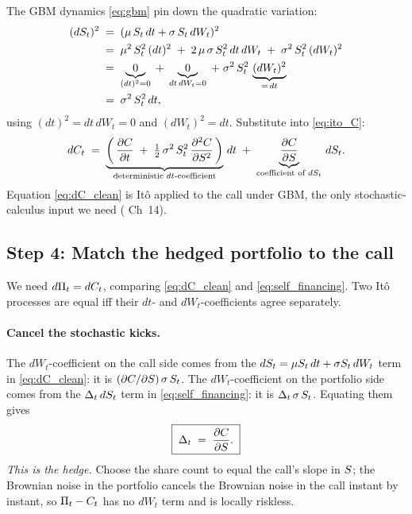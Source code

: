 The GBM dynamics \eqref{eq:gbm} pin down the quadratic variation:
\begin{align}
  (dS_t)^2
  \;&=\; (\mu\,S_t\,dt + \sigma\,S_t\,dW_t)^2
  \nonumber \\
  \;&=\; \mu^2\,S_t^2\,(dt)^2
       \;+\; 2\,\mu\,\sigma\,S_t^2\,dt\,dW_t
       \;+\; \sigma^2\,S_t^2\,(dW_t)^2
  \nonumber \\
  \;&=\; \underbrace{0}_{(dt)^2 = 0}
       \;+\; \underbrace{0}_{dt\,dW_t = 0}
       \;+\; \sigma^2\,S_t^2\,
             \underbrace{(dW_t)^2}_{=\,dt}
  \nonumber \\
  \;&=\; \sigma^2\,S_t^2\,dt,
  \label{eq:dS_squared}
\end{align}
using $(dt)^2 = dt\,dW_t = 0$ and $(dW_t)^2 = dt$. Substitute
into \eqref{eq:ito_C}:
\begin{equation}
  dC_t
  \;=\;
  \underbrace{\left(\,\frac{\partial C}{\partial t}
              \;+\; \tfrac{1}{2}\,\sigma^2\,S_t^2\,
                    \frac{\partial^2 C}{\partial S^2}\,\right)}_{
              \text{deterministic } dt\text{-coefficient}}
  \,dt
  \;+\;
  \underbrace{\frac{\partial C}{\partial S}}_{
              \text{coefficient of }dS_t}
  \,dS_t.
  \label{eq:dC_clean}
\end{equation}
Equation \eqref{eq:dC_clean} is It\^o applied to the call under
GBM, the only stochastic-calculus input we need
(\citeHull{} Ch~14).

\subsection{Step 4: Match the hedged portfolio to the call}
\label{subsec:ch15_pde_step4}

We need $d\Pi_t = dC_t$, comparing \eqref{eq:dC_clean} and
\eqref{eq:self_financing}. Two It\^o processes are equal iff
their $dt$- and $dW_t$-coefficients agree separately.

\paragraph{Cancel the stochastic kicks.}
The $dW_t$-coefficient on the call side comes from the
$dS_t = \mu S_t\, dt + \sigma S_t\, dW_t$ term in
\eqref{eq:dC_clean}: it is $(\partial C/\partial S)\,
\sigma\,S_t$. The $dW_t$-coefficient on the portfolio side
comes from the $\Delta_t\, dS_t$ term in
\eqref{eq:self_financing}: it is $\Delta_t\,\sigma\,S_t$.
Equating them gives
\begin{equation}
  \boxed{\;\Delta_t \;=\; \frac{\partial C}{\partial S}.\;}
  \label{eq:delta_choice}
\end{equation}
\emph{This is the hedge.} Choose the share count to equal the
call's slope in $S$; the Brownian noise in the portfolio
cancels the Brownian noise in the call instant by instant, so
$\Pi_t - C_t$ has no $dW_t$ term and is locally riskless.

